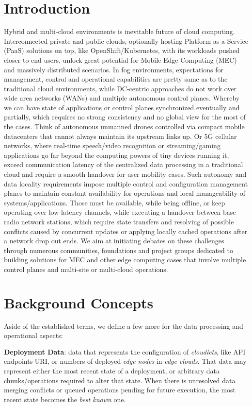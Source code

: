 \documentclass[conference]{IEEEtran}
\begin{document}
\section{Introduction}
Hybrid and multi-cloud environments is inevitable future of cloud computing.
Interconnected private and public clouds, optionally hosting
Platform-as-a-Service (PaaS) solutions on top, like OpenShift/Kubernetes, with
its workloads pushed closer to end users, unlock great potential for Mobile
Edge Computing (MEC) and massively distributed scenarios. In fog environments,
expectations for management, control and operational capabilities are pretty
same as to the traditional cloud environments, while DC-centric approaches do
not work over wide area networks (WANs) and multiple autonomous control planes.
Whereby we can have state of applications or control planes synchronized
eventually and partially, which requires no strong consistency and no global
view for the most of the cases. Think of autonomous unmanned drones controlled
via compact mobile datacenters that cannot always maintain its upstream links
up. Or 5G cellular networks, where real-time speech/video recognition or
streaming/gaming applications go far beyond the computing powers of tiny
devices running it, exceed communication latency of the centralized data
processing in a traditional cloud and require a smooth handover for user
mobility cases. Such autonomy and data locality requirements impose multiple
control and configuration management planes to maintain constant availability
for operations and local manageability of systems/applications. Those must be
available, while being offline, or keep operating over low-latency channels,
while executing a handover between base radio network stations, which require
state transfers and resolving of possible conflicts caused by concurrent
updates or applying locally cached operations after a network drop out ends. We
aim at initiating debates on these challenges through numerous communities,
foundations and project groups dedicated to building solutions for MEC and
other edge computing cases that involve multiple control planes and multi-site
or multi-cloud operations.

\section{Background Concepts}
Aside of the established terms\cite{b3}, we define a few more for the data
processing and operational aspects:

\textbf{Deployment Data}: data that represents the configuration of
\textit{cloudlets}\cite{b3}, like API endpoints URI, or numbers of deployed
\textit{edge nodes}\cite{b3} in \textit{edge clouds}\cite{b3}. That data may
represent either the most recent state of a deployment, or arbitrary data
chunks/operations required to alter that state. When there is unresolved data
merging conflicts or queued operations pending for future execution, the most
recent state becomes the \textit{best known} one.
\end{document}
